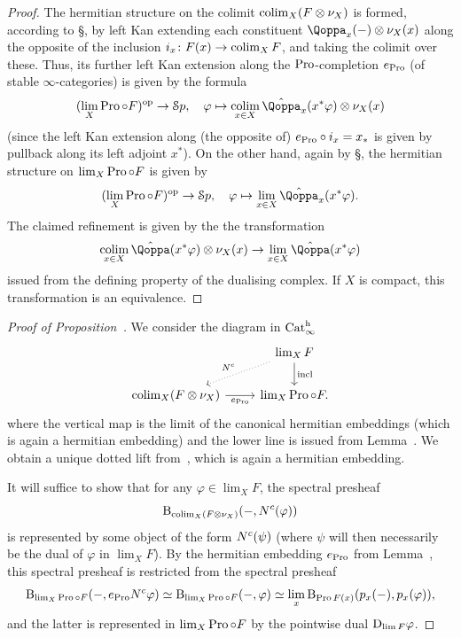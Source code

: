 \begin{proof}
 The hermitian structure on the colimit $\mathop{\mathrm{colim}}_X (F\otimes \nu_X)$ is formed, according to \S{}, by left Kan extending each constituent $\QF_x(-)\otimes \nu_X(x)$ along the opposite of  the inclusion $i_x\colon F(x)\to \mathop{\mathrm{colim}}_X F$, and taking the colimit over these. Thus, its further left Kan extension along the $\operatorname{Pro}$-completion $e_{\operatorname{Pro}}$ (of stable $\infty$-categories) is given by the formula 
\[
(\lim_X \Pro\circ F)\op\to \Spa, \quad \varphi\mapsto \colim_{x\in X} \hat \QF_x(x^* \varphi)\otimes \nu_X(x)
\]
(since the left Kan extension along (the opposite of) $e_{\operatorname{Pro}}\circ i_x = x_*$ is given by pullback along its left adjoint $x^*$). 
On the other hand, again by \S{}, the hermitian structure on $\lim_X \operatorname{Pro}\circ F$ is given by 
\[
(\lim_X \Pro\circ F)\op\to \Spa, \quad \varphi\mapsto \lim_{x\in X} \hat  \QF_x(x^* \varphi).
\]
The claimed refinement is given by the the transformation 
\[
\colim_{x\in X} \hat  \QF(x^*\varphi) \otimes \nu_X(x) \to \lim_{x\in X} \hat  \QF(x^*\varphi)
\]
issued from the defining property of the dualising complex. If $X$ is compact, this transformation is an equivalence. 
\end{proof}



\begin{proof}[Proof of Proposition~]
We consider the diagram in $\mathrm{Cat}^\mathrm{h}_\infty$ 
 \begin{equation}
\label{eq:cocartesian_conorm_and_e_Ind}%
\begin{tikzcd}
 & \lim_X F \ar[ld, "\cconorm"', dotted] \ar[d, "\mathrm{incl}"] \\
 \colim_X (F\otimes \nu_X) \ar[r, "e_{\Pro}"'] & \lim_X \Pro\circ F.
\end{tikzcd}
\end{equation}
where the vertical map is the limit of the canonical hermitian embeddings (which is again a hermitian embedding) and the lower line is issued from Lemma~. We obtain a unique dotted lift from~,
which is again a hermitian embedding. 

It will suffice to show that for any $\varphi\in \lim_X F$, the spectral presheaf
\[
\mathrm{B}_{\mathop{\mathrm{colim}}_X (F\otimes \nu_X)}(-, N^c(\varphi))
\]
is represented by some object of the form $N^c(\psi)$ (where $\psi$ will then necessarily be the dual of $\varphi$ in $\lim_X F$). By the hermitian embedding $e_{\operatorname{Pro}}$ from Lemma~, this spectral presheaf is restricted from the spectral presheaf 
\[
\mathrm{B}_{\lim_X \operatorname{Pro}\circ F}(-, e_{\operatorname{Pro}}N^c \varphi) \simeq \mathrm{B}_{\lim_X \operatorname{Pro}\circ F}(-, \varphi) \simeq \lim_x \mathrm{B}_{\operatorname{Pro} F(x)}(p_x(-),p_x(\varphi)),
\]
and the latter is represented in $\lim_X \operatorname{Pro}\circ F$ by the pointwise dual $\mathrm{D}_{\lim F} \varphi$.
\end{proof}



